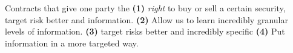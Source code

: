 Contracts that give one party the \textbf{(1)} \textit{right} to buy or sell a certain security, target risk better and information. \textbf{(2)} Allow us to learn incredibly granular levels of information. \textbf{(3)} target risks better and incredibly specific \textbf{(4)} Put information in a more targeted way. 